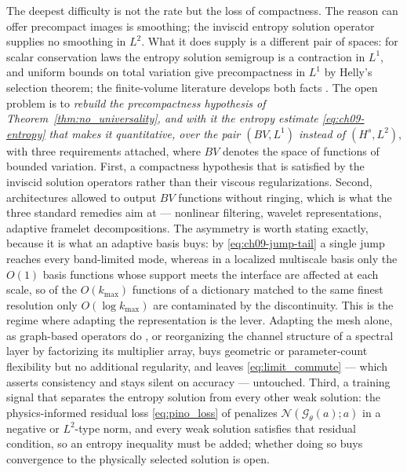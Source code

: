 The deepest difficulty is not the rate but the loss of compactness. The reason
 can offer
precompact images is smoothing; the inviscid entropy solution operator supplies
no smoothing in $L^2$. What it does supply is a different pair of spaces: for
scalar conservation laws the entropy solution semigroup is a contraction in
$L^1$, and uniform bounds on total variation give precompactness in $L^1$ by
Helly's selection theorem; the finite-volume literature develops both facts
\cite{leveque2002finite}. The open problem is to
\emph{rebuild the precompactness hypothesis of
Theorem~\ref{thm:no_universality}, and with it the entropy estimate
\eqref{eq:ch09-entropy} that makes it quantitative, over the pair $(BV, L^1)$ instead of $(H^s,
L^2)$}, with three requirements attached, where $BV$ denotes the space of
functions of bounded variation. First, a compactness hypothesis that
is satisfied by the inviscid solution operators rather than their viscous
regularizations. Second, architectures allowed to output $BV$ functions without
ringing, which is what the three standard remedies aim at --- nonlinear
filtering, wavelet representations, adaptive framelet decompositions.
The asymmetry is worth stating exactly, because it is what an adaptive basis
buys: by \eqref{eq:ch09-jump-tail} a single jump reaches every band-limited mode,
whereas in a localized multiscale basis only the $O(1)$ basis functions whose
support meets the interface are affected at each scale, so of the $O(k_{\max})$
functions of a dictionary matched to the same finest resolution only
$O(\log k_{\max})$ are contaminated by the discontinuity. This is the regime
where adapting the representation is the lever. Adapting the mesh alone, as
graph-based operators do \cite{li2023geometry}, or reorganizing the
channel structure of a spectral layer by factorizing its multiplier array, buys
geometric or parameter-count flexibility but no additional regularity, and leaves
\eqref{eq:limit_commute} --- which asserts consistency and stays silent on
accuracy --- untouched. Third, a training signal that separates the entropy
solution from every other weak solution: the physics-informed residual loss \eqref{eq:pino_loss}
of  penalizes
$\mathcal{N}(\mathcal{G}_\theta(a);a)$ in a negative or $L^2$-type norm, and
every weak solution satisfies that residual condition, so an entropy inequality
must be added; whether doing so buys convergence to the physically selected
solution is open.

